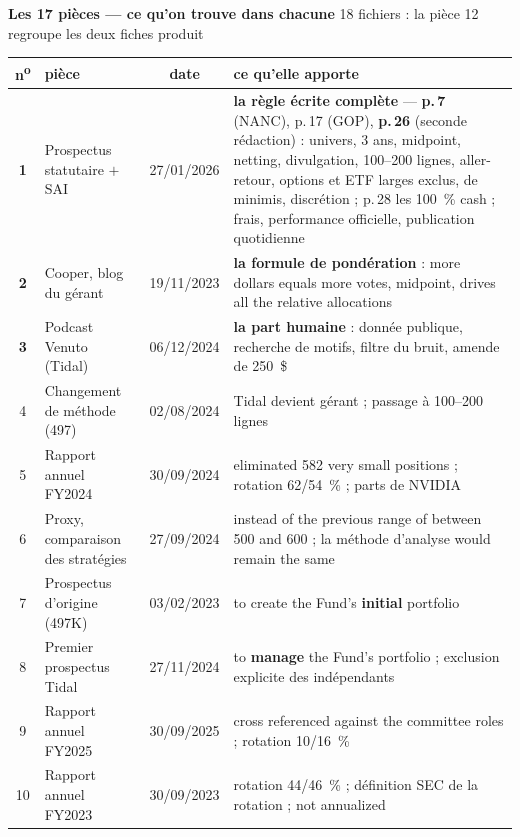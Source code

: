 \documentclass[9pt,a4paper]{extarticle}
\begin{document}
\vspace{0.8mm}
{\color{bleu}\bfseries Les 17 pièces --- ce qu'on trouve dans chacune}\hfill{\footnotesize\color{grisf} 18 fichiers : la pièce 12 regroupe les deux fiches produit}\par\vspace{1mm}
{\scriptsize
\begin{tabular}{@{}c R{3.4cm} c R{9.0cm}@{}}
\toprule
\textbf{n\textsuperscript{o}} & \textbf{pièce} & \textbf{date} & \textbf{ce qu'elle apporte} \\
\midrule
\textbf{1} & Prospectus statutaire $+$ SAI & 27/01/2026 & \textbf{la règle écrite complète} --- \textbf{p.\,7} (NANC), p.\,17 (GOP), \textbf{p.\,26} (seconde rédaction) : univers, 3 ans, midpoint, netting, divulgation, 100--200 lignes, aller-retour, options et ETF larges exclus, de minimis, discrétion ; p.\,28 les 100~\% cash ; frais, performance officielle, publication quotidienne \\
\textbf{2} & Cooper, blog du gérant & 19/11/2023 & \textbf{la formule de pondération} : \og{}more dollars equals more votes\fg{}, midpoint, \og{}drives all the relative allocations\fg{} \\
\textbf{3} & Podcast Venuto (Tidal) & 06/12/2024 & \textbf{la part humaine} : donnée publique, recherche de motifs, filtre du bruit, amende de 250~\$ \\
4 & Changement de méthode (497) & 02/08/2024 & Tidal devient gérant ; passage à 100--200 lignes \\
5 & Rapport annuel FY2024 & 30/09/2024 & \og{}eliminated 582 very small positions\fg{} ; rotation 62/54~\% ; parts de NVIDIA \\
6 & Proxy, comparaison des stratégies & 27/09/2024 & \og{}instead of the previous range of between 500 and 600\fg{} ; la méthode d'analyse \og{}would remain the same\fg{} \\
7 & Prospectus d'origine (497K) & 03/02/2023 & \og{}to create the Fund's \textbf{initial} portfolio\fg{} \\
8 & Premier prospectus Tidal & 27/11/2024 & \og{}to \textbf{manage} the Fund's portfolio\fg{} ; exclusion explicite des indépendants \\
9 & Rapport annuel FY2025 & 30/09/2025 & \og{}cross referenced against the committee roles\fg{} ; rotation 10/16~\% \\
10 & Rapport annuel FY2023 & 30/09/2023 & rotation 44/46~\% ; définition SEC de la rotation ; \og{}not annualized\fg{} \\

\end{tabular}}
\end{document}
